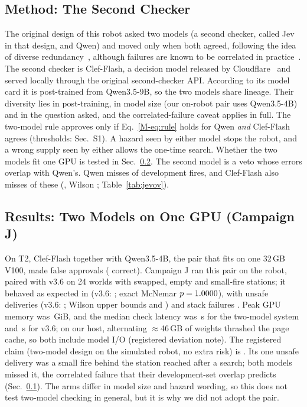 \documentclass[conference]{IEEEtran}
\begin{document}
\subsection{Method: The Second Checker}\label{sec:jev-method}
The original design of this robot asked two models (a second checker, called Jev in that design, and Qwen) and moved only when both agreed, following the
idea of diverse redundancy~\cite{avizienis1985nversion}, although failures are known to be correlated in practice~\cite{knight1986experimental}. The second checker is Clef-Flash, a decision model released by Cloudflare~\cite{cloudflare2026clefcard,chen2026clefblog} and served locally through the original second-checker API.
According to its model card it is post-trained from Qwen3.5-9B, so the two models share lineage. Their diversity lies in
post-training, in model size (our on-robot pair uses Qwen3.5-4B) and in the question asked, and the correlated-failure
caveat applies in full. The two-model rule approves only if Eq.~\eqref{M-eq:rule} holds for Qwen \emph{and}
Clef-Flash agrees (thresholds: Sec.~S1). A hazard seen by either model stops the robot, and a wrong supply seen by either
allows the one-time search. Whether the two models fit one GPU is
tested in Sec.~\ref{sec:jev-res}. The second model is a veto whose errors overlap with Qwen's. Qwen misses \JevOvQ{} of \JevOvN{} development fires, and Clef-Flash also misses \JevOvBoth{} of these (\JevOvCond, Wilson \JevOvCondCI; Table~\ref{tab:jevov}).

\subsection{Results: Two Models on One GPU (Campaign J)}\label{sec:jev-res}
On T2, Clef-Flash together with
Qwen3.5-4B, the pair that fits on one 32\,GB V100, made \TTPairFA{} false approvals (\TTPairCA{} correct).
Campaign J ran this pair on the robot, paired with v3.6 on 24 worlds with swapped, empty and small-fire stations;
it behaved as expected in \JCorrectJ{} (v3.6: \JCorrectA; exact McNemar $p=1.0000$), with
unsafe deliveries \JUnsafeJ{} (v3.6: \JUnsafeA; Wilson upper bounds \JUnsafeJUpper{} and \JUnsafeAUpper) and stack failures \JFailedJ{}. Peak GPU memory was \JPeakVram\,GiB, and
the median check latency was \JLatJ\,s for the two-model system and \JLatA\,s for v3.6; on our host, alternating $\approx$46\,GB of weights thrashed the page cache, so both include model I/O (registered deviation note). The registered claim (two-model design on the
simulated robot, no extra risk) is \JClaim.
Its one unsafe delivery was a small fire behind the station reached after a search; both models missed it, the correlated
failure that their development-set overlap predicts (Sec.~\ref{sec:jev-method}). The arms differ in model size and hazard wording, so this
does not test two-model checking in general, but it is why we did not adopt the pair.
\end{document}
